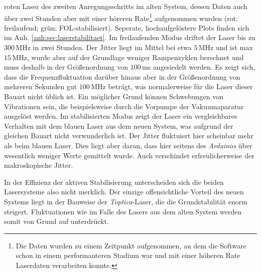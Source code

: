 roten Laser des zweiten Anregungsschritts im alten System, dessen Daten auch über zwei Stunden aber mit einer
höreren Rate\footnote{Die Daten wurden zu einem Zeitpunkt aufgenommen, an dem die Software schon in einem performanteren
Stadium war und mit einer höheren Rate Laserdaten verarbeiten konnte.}
aufgenommen wurden (rot: freilaufend;
grün: FOL-stabilisiert). Seperate, hochaufgelöstere Plots finden sich im Anh.
\ref{anh:sec:laserstabilitaet}. Im freilaufenden Modus driftet der Laser bis
zu $300\,$MHz in zwei Stunden. Der Jitter liegt im Mittel bei etwa $5\,$MHz und
ist max $15\,$MHz, wurde aber auf der Grundlage weniger Rampenzyklen berechnet
und muss deshalb in der Größenordnung von $100\,$ms angesiedelt werden. Es zeigt sich, dass die
Frequenzfluktuation darüber hinaus aber in der Größenordnung von mehreren
Sekunden gut $100\,$MHz beträgt, was normalerweise für die Laser dieser Bauart
nicht üblich ist. Ein möglicher Grund können Schwebungen von Vibrationen sein,
die beispielsweise durch die Vorpumpe der Vakuumaparatur ausgelöst werden. Im
stabilisierten Modus zeigt der Laser ein vergleichbares Verhalten mit
dem blauen Laser aus dem neuen System, was aufgrund der gleichen Bauart nicht
verwunderlich ist. Der Jitter fluktuiert hier scheinbar mehr als beim blauen
Laser. Dies liegt aber daran, dass hier seitens des \textit{Arduinos} über
wesentlich weniger Werte gemittelt wurde. Auch verschindet erfreulicherweise der
makroskopische Jitter.\par
In der Effizienz der aktiven Stabilisierung unterscheiden sich die beiden
Lasersysteme also nicht merklich. Der einzige offensichtliche Vorteil des neuen
Systems liegt in der Bauweise der \textit{Toptica}-Laser, die die
Grundstabilität enorm steigert. Fluktuationen wie im Falle des Lasers aus dem
alten System werden somit von Grund auf unterdrückt.


